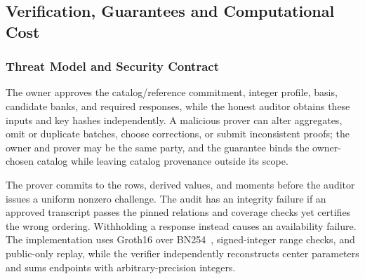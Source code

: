 \documentclass[5p,times,twocolumn]{elsarticle}
\begin{document}
\subsection{Verification, Guarantees and Computational Cost}
\label{sec:methodology-guarantees}
\subsubsection{Threat Model and Security Contract}
\label{sec:security-contract}
The owner approves the catalog/reference commitment, integer profile, basis, candidate banks, and required responses, while the honest auditor obtains these inputs and key hashes independently. A malicious prover can alter aggregates, omit or duplicate batches, choose corrections, or submit inconsistent proofs; the owner and prover may be the same party, and the guarantee binds the owner-chosen catalog while leaving catalog provenance outside its scope.

The prover commits to the rows, derived values, and moments before the
auditor issues a uniform nonzero challenge. The audit has an integrity
failure if an approved transcript passes the pinned relations and coverage
checks yet certifies the wrong ordering. Withholding a response instead
causes an availability failure. The implementation uses Groth16 over BN254~\cite{groth2016}, signed-integer range checks, and public-only replay, while the verifier independently reconstructs center parameters and sums endpoints with arbitrary-precision integers.
\end{document}
